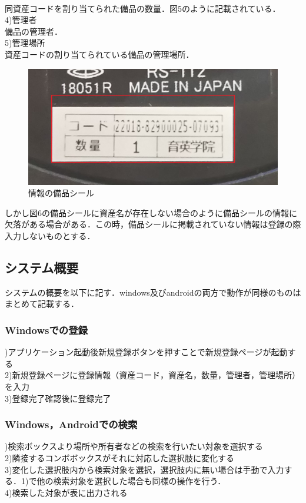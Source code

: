 \documentclass[11pt,a4j]{jarticle}
\begin{document}
\\同資産コードを割り当てられた備品の数量．図5のように記載されている．
\\4)管理者
\\備品の管理者．
\\5)管理場所
\\資産コードの割り当てられている備品の管理場所．
  \newpage
  \begin{figure}[h]
    \begin{center}
\includegraphics[keepaspectratio, scale=0.2]{jouhoutouroku2}
\caption{情報の備品シール}
\end{center}
\end{figure}

しかし図6の備品シールに資産名が存在しない場合のように備品シールの情報に欠落がある場合がある．この時，備品シールに掲載されていない情報は登録の際入力しないものとする．

  \subsection{システム概要}
  
システムの概要を以下に記す．windows及びandroidの両方で動作が同様のものはまとめて記載する．

\subsubsection{Windowsでの登録}
)アプリケーション起動後新規登録ボタンを押すことで新規登録ページが起動する
\\2)新規登録ページに登録情報（資産コード，資産名，数量，管理者，管理場所）を入力
\\3)登録完了確認後に登録完了

\subsubsection{Windows，Androidでの検索}
)検索ボックスより場所や所有者などの検索を行いたい対象を選択する
\\2)隣接するコンボボックスがそれに対応した選択肢に変化する
\\3)変化した選択肢内から検索対象を選択，選択肢内に無い場合は手動で入力する．1)で他の検索対象を選択した場合も同様の操作を行う．
\\4)検索した対象が表に出力される
\end{document}

